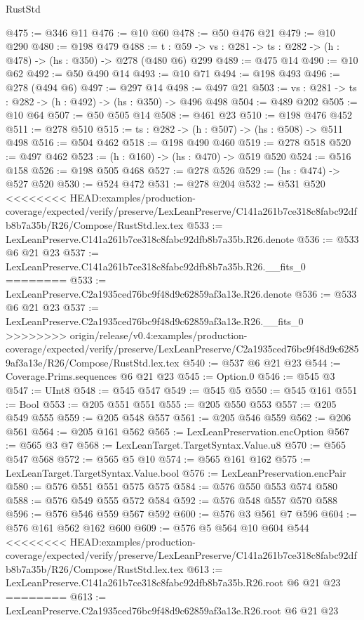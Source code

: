 \begin{lexlean}{RustStd}
\begin{coremodule}
{\begin{coremodule}
@475 := @346 @11
@476 := @10 @60
@478 := @50 @476 @21
@479 := @10 @290
@480 := @198 @479
@488 := {t : @59} -> {vs : @281} -> {ts : @282} -> (h : @478) -> (hs : @350) -> @278 (@480 @6) @299
@489 := @475 @14
@490 := @10 @62
@492 := @50 @490 @14
@493 := @10 @71
@494 := @198 @493
@496 := @278 (@494 @6)
@497 := @297 @14
@498 := @497 @21
@503 := {vs : @281} -> {ts : @282} -> (h : @492) -> (hs : @350) -> @496 @498
@504 := @489 @202
@505 := @10 @64
@507 := @50 @505 @14
@508 := @461 @23
@510 := @198 @476 @452
@511 := @278 @510
@515 := {ts : @282} -> (h : @507) -> (hs : @508) -> @511 @498
@516 := @504 @462
@518 := @198 @490 @460
@519 := @278 @518
@520 := @497 @462
@523 := (h : @160) -> (hs : @470) -> @519 @520
@524 := @516 @158
@526 := @198 @505 @468
@527 := @278 @526
@529 := (hs : @474) -> @527 @520
@530 := @524 @472
@531 := @278 @204
@532 := @531 @520
<<<<<<<< HEAD:examples/production-coverage/expected/verify/preserve/LexLeanPreserve/C141a261b7ce318c8fabc92dfb8b7a35b/R26/Compose/RustStd.lex.tex
@533 := LexLeanPreserve.C141a261b7ce318c8fabc92dfb8b7a35b.R26.denote
@536 := @533 @6 @21 @23
@537 := LexLeanPreserve.C141a261b7ce318c8fabc92dfb8b7a35b.R26.__fits_0
========
@533 := LexLeanPreserve.C2a1935ced76bc9f48d9c62859af3a13e.R26.denote
@536 := @533 @6 @21 @23
@537 := LexLeanPreserve.C2a1935ced76bc9f48d9c62859af3a13e.R26.__fits_0
>>>>>>>> origin/release/v0.4:examples/production-coverage/expected/verify/preserve/LexLeanPreserve/C2a1935ced76bc9f48d9c62859af3a13e/R26/Compose/RustStd.lex.tex
@540 := @537 @6 @21 @23
@544 := Coverage.Prims.sequences @6 @21 @23
@545 := Option.{0}
@546 := @545 @3
@547 := UInt8
@548 := @545 @547
@549 := @545 @5
@550 := @545 @161
@551 := Bool
@553 := @205 @551 @551
@555 := @205 @550 @553
@557 := @205 @549 @555
@559 := @205 @548 @557
@561 := @205 @546 @559
@562 := @206 @561
@564 := @205 @161 @562
@565 := LexLeanPreservation.encOption
@567 := @565 @3 @7
@568 := LexLeanTarget.TargetSyntax.Value.u8
@570 := @565 @547 @568
@572 := @565 @5 @10
@574 := @565 @161 @162
@575 := LexLeanTarget.TargetSyntax.Value.bool
@576 := LexLeanPreservation.encPair
@580 := @576 @551 @551 @575 @575
@584 := @576 @550 @553 @574 @580
@588 := @576 @549 @555 @572 @584
@592 := @576 @548 @557 @570 @588
@596 := @576 @546 @559 @567 @592
@600 := @576 @3 @561 @7 @596
@604 := @576 @161 @562 @162 @600
@609 := @576 @5 @564 @10 @604 @544
<<<<<<<< HEAD:examples/production-coverage/expected/verify/preserve/LexLeanPreserve/C141a261b7ce318c8fabc92dfb8b7a35b/R26/Compose/RustStd.lex.tex
@613 := LexLeanPreserve.C141a261b7ce318c8fabc92dfb8b7a35b.R26.root @6 @21 @23
========
@613 := LexLeanPreserve.C2a1935ced76bc9f48d9c62859af3a13e.R26.root @6 @21 @23

\end{coremodule}}
\end{coremodule}
\end{lexlean}
